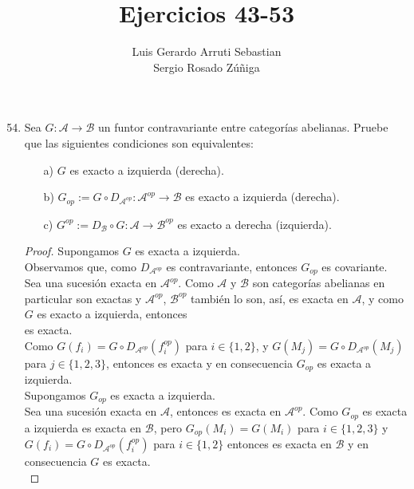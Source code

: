 \documentclass{article}
\title{Ejercicios 43-53}
\author{Luis Gerardo Arruti Sebastian\\ Sergio Rosado Zúñiga}
\date{}
\begin{document}
	\maketitle
	\begin{enumerate}[label=\textbf{Ej \arabic*.}]
		\setcounter{enumi}{53}
\item Sea $G:\mathscr{A}\longrightarrow \mathscr{B}$ un funtor contravariante entre categorías abelianas. Pruebe que las siguientes condiciones son
equivalentes:
\begin{itemize}
\item[a)] $G$ es exacto a izquierda (derecha).
\item[b)] $G_{op}:=G\circ D_{\mathscr{A}^{op}}\colon\mathscr{A}^{op}\longrightarrow\mathscr{B}$ es exacto a izquierda (derecha).
\item[c)] $G^{op}:= D_{\mathscr{B}}\circ G\colon\mathscr{A}\longrightarrow\mathscr{B}^{op}$ es exacto a derecha (izquierda).
\end{itemize}
\begin{proof}
 Supongamos $G$ es exacta a izquierda.\\

Observamos que, como $D_{\mathscr{A}^{op}}$ es contravariante, entonces $G_{op}$ es covariante. Sea 
 una sucesión exacta en $\mathscr{A}^{op}$. 
Como $\mathscr{A}$ y $\mathscr{B}$ son categorías abelianas en particular son exactas y $\mathscr{A}^{op}$, $\mathscr{B}^{op}$ también lo son, 
así,  es exacta en $\mathscr{A}$, y como $G$ es exacto a izquierda, entonces \\
 es exacta.\\

Como $G(f_i)=G\circ D_{\mathscr{A}^{op}}(f_i^{op})$ para $i\in \{1,2\}$, y $G(M_j)=G\circ D_{\mathscr{A}^{op}}(M_j)$ para $j\in \{1,2,3\}$, entonces
 es exacta
 y en consecuencia $G_{op}$ es exacta a izquierda.\\

 Supongamos $G_{op}$ es exacta a izquierda.\\

Sea  una sucesión exacta en $\mathscr{A}$, entonces 
 es exacta en $\mathscr{A}^{op}$. Como $G_{op}$ es exacta a izquierda
 es exacta en $\mathscr{B}$,
pero $G_{op}(M_i)=G(M_i)$ para $i\in\{1,2,3\}$ y $G(f_i)=G\circ D_{\mathscr{A}^{op}}(f_i^{op})$ para $i\in \{1,2\}$ entonces 
 es exacta en $\mathscr{B}$ y en consecuencia $G$ es exacta.\\


\end{proof}
\end{enumerate}
\end{document}
